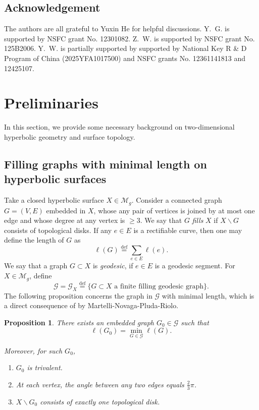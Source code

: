 \documentclass[UTF8]{amsart}
\newtheorem{proposition}[theorem]{Proposition}
\numberwithin{equation}{section}
\theoremstyle{definition}
\theoremstyle{example}
\theoremstyle{remark}
\begin{document}
\subsection*{Acknowledgement}
The authors are all grateful to Yuxin He for helpful discussions. Y.~G. is supported by NSFC grant No. 12301082. Z.~W. is supported by NSFC grant No. 125B2006. Y.~W. is partially supported by supported by National Key R \& D Program of China (2025YFA1017500) and NSFC grants No. 12361141813 and 12425107. 

\section{Preliminaries}
\label{sec:pre}

In this section, we provide some necessary background on two-dimensional hyperbolic geometry and surface topology.

\subsection{Filling graphs with minimal length on hyperbolic surfaces}\label{sec:short_gph}

Take a closed hyperbolic surface $X \in \mathcal{M}_g$. Consider a connected graph $G=(V,E)$ embedded in $X$, whose any pair of vertices is joined by at most one edge and whose degree at any vertex is $ \ge 3$. 
We say that $G$ {\em fills} $X$ if $X \backslash G$ consists of topological disks. 
If any $e\in E$ is a rectifiable curve, then one may define the length of $G$ as
\[
	\ell(G) \overset{\mathrm{def}}{=} \sum_{e\in E}\ell(e). 
\]
We say that a graph $G \subset X$ is \emph{geodesic}, if $e\in E$ is a geodesic segment. 
For $X \in \mathcal{M}_g$, define
\[
	\mathcal{G} = \mathcal{G}_X \overset{\mathrm{def}}{=} \{ G \subset X \text{ a finite filling geodesic graph} \}. 
\] 
The following proposition concerns the graph in $\mathcal{G}$ with minimal length, which is a direct consequence of \cite[Theorem 1.2(3)]{martelli2015spines} by Martelli-Novaga-Pluda-Riolo.
\begin{proposition}
There exists an embedded graph $G_0\in \mathcal{G}$ such that $$\ell(G_0)=\min\limits_{G \in \mathcal{G}} \ell(G).$$ 

	Moreover, for such $G_0$, 
	\begin{enumerate}
		\item $G_0$ is trivalent. \label{item:trivalent}
		\item At each vertex, the angle between any two edges equals $ \frac{2}{3} \pi$. \label{item:hyperplane}

		\item $X \backslash G_0$ consists of exactly one topological disk.
	\end{enumerate}
	\label{prop:min_prop}
\end{proposition}
\end{document}
